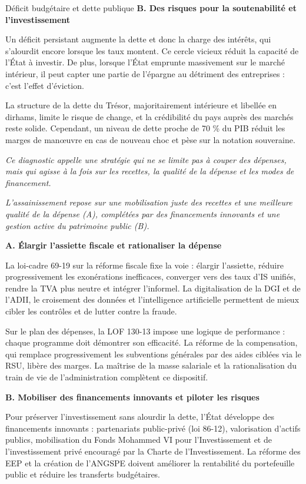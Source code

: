 \begin{copiemodele}{Déficit budgétaire et dette publique}
\textbf{B. Des risques pour la soutenabilité et l'investissement}

Un déficit persistant augmente la dette et donc la charge des intérêts, qui s'alourdit encore lorsque les taux montent. Ce cercle vicieux réduit la capacité de l'État à investir. De plus, lorsque l'État emprunte massivement sur le marché intérieur, il peut capter une partie de l'épargne au détriment des entreprises : c'est l'effet d'éviction.

La structure de la dette du Trésor, majoritairement intérieure et libellée en dirhams, limite le risque de change, et la crédibilité du pays auprès des marchés reste solide. Cependant, un niveau de dette proche de 70 \% du PIB réduit les marges de manœuvre en cas de nouveau choc et pèse sur la notation souveraine.

\textit{Ce diagnostic appelle une stratégie qui ne se limite pas à couper des dépenses, mais qui agisse à la fois sur les recettes, la qualité de la dépense et les modes de financement.}

\textit{L'assainissement repose sur une mobilisation juste des recettes et une meilleure qualité de la dépense (A), complétées par des financements innovants et une gestion active du patrimoine public (B).}

\textbf{A. Élargir l'assiette fiscale et rationaliser la dépense}

La loi-cadre 69-19 sur la réforme fiscale fixe la voie : élargir l'assiette, réduire progressivement les exonérations inefficaces, converger vers des taux d'IS unifiés, rendre la TVA plus neutre et intégrer l'informel. La digitalisation de la DGI et de l'ADII, le croisement des données et l'intelligence artificielle permettent de mieux cibler les contrôles et de lutter contre la fraude.

Sur le plan des dépenses, la LOF 130-13 impose une logique de performance : chaque programme doit démontrer son efficacité. La réforme de la compensation, qui remplace progressivement les subventions générales par des aides ciblées via le RSU, libère des marges. La maîtrise de la masse salariale et la rationalisation du train de vie de l'administration complètent ce dispositif.

\textbf{B. Mobiliser des financements innovants et piloter les risques}

Pour préserver l'investissement sans alourdir la dette, l'État développe des financements innovants : partenariats public-privé (loi 86-12), valorisation d'actifs publics, mobilisation du Fonds Mohammed VI pour l'Investissement et de l'investissement privé encouragé par la Charte de l'Investissement. La réforme des EEP et la création de l'ANGSPE doivent améliorer la rentabilité du portefeuille public et réduire les transferts budgétaires.


\end{copiemodele}
